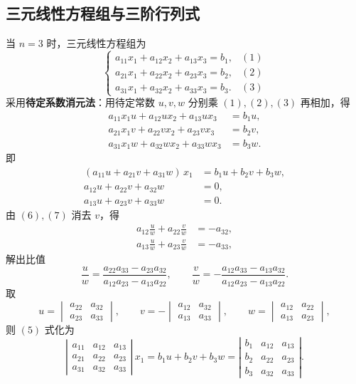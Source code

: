\subsection{三元线性方程组与三阶行列式}

当 $n=3$ 时，三元线性方程组为
\begin{equation}
\begin{cases}
a_{11}x_1 + a_{12}x_2 + a_{13}x_3 = b_1, & (1)\\
a_{21}x_1 + a_{22}x_2 + a_{23}x_3 = b_2, & (2)\\
a_{31}x_1 + a_{32}x_2 + a_{33}x_3 = b_3. & (3)
\end{cases}
\end{equation}
采用\textbf{待定系数消元法}：用待定常数 $u,v,w$ 分别乘 $(1),(2),(3)$ 再相加，得
\begin{align*}
a_{11}x_1u + a_{12}ux_2 + a_{13}ux_3 &= b_1u,\\
a_{21}x_1v + a_{22}vx_2 + a_{23}vx_3 &= b_2v,\\
a_{31}x_1w + a_{32}wx_2 + a_{33}wx_3 &= b_3w.
\end{align*}
即
\begin{align}
(a_{11}u+a_{21}v+a_{31}w)\,x_1 &= b_1u+b_2v+b_3w, \tag{5}\\
a_{12}u+a_{22}v+a_{32}w &= 0, \tag{6}\\
a_{13}u+a_{23}v+a_{33}w &= 0. \tag{7}
\end{align}
由 $(6),(7)$ 消去 $v$，得
\begin{align}
a_{12}\frac{u}{w}+a_{22}\frac{v}{w} &= -a_{32}, \tag{8}\\
a_{13}\frac{u}{w}+a_{23}\frac{v}{w} &= -a_{33}, \tag{9}
\end{align}
解出比值
\[
\frac{u}{w}=\frac{a_{22}a_{33}-a_{23}a_{32}}{a_{12}a_{23}-a_{13}a_{22}},\qquad
\frac{v}{w}=-\frac{a_{12}a_{33}-a_{13}a_{32}}{a_{12}a_{23}-a_{13}a_{22}}.
\]
取
\[
u=\begin{vmatrix} a_{22} & a_{32}\\ a_{23} & a_{33}\end{vmatrix},\qquad
v=-\begin{vmatrix} a_{12} & a_{32}\\ a_{13} & a_{33}\end{vmatrix},\qquad
w=\begin{vmatrix} a_{12} & a_{22}\\ a_{13} & a_{23}\end{vmatrix},
\]
则 $(5)$ 式化为
\[
\left|\begin{matrix}
a_{11} & a_{12} & a_{13}\\
a_{21} & a_{22} & a_{23}\\
a_{31} & a_{32} & a_{33}
\end{matrix}\right|\,x_1
= b_1u+b_2v+b_3w
=\left|\begin{matrix}
b_1 & a_{12} & a_{13}\\
b_2 & a_{22} & a_{23}\\
b_3 & a_{32} & a_{33}
\end{matrix}\right|.
\]

